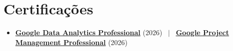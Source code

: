 \section{Certificações}
\begin{itemize}[leftmargin=0.15in, label={}, topsep=2pt]
  \item \small{\textbf{\href{\certAnalyticsURL}{Google Data Analytics Professional}} (2026) \, $|$ \, \textbf{\href{\certProjectURL}{Google Project Management Professional}} (2026)}
\end{itemize}
